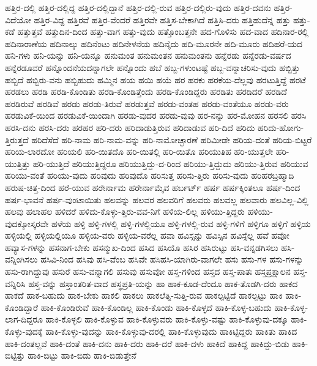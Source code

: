 {ಹತ್ತಿರ-ದಲ್ಲಿ
ಹತ್ತಿರ-ದಲ್ಲಿದ್ದ
ಹತ್ತಿರ-ದಲ್ಲಿದ್ದಾನೆ
ಹತ್ತಿರ-ದಲ್ಲಿ-ರುವ
ಹತ್ತಿರ-ದಲ್ಲಿರು-ವುದು
ಹತ್ತಿರ-ದವನು
ಹತ್ತಿರ-ವಿದೆಯೋ
ಹತ್ತಿರ-ವಿದ್ದ
ಹತ್ತಿರವೆ
ಹತ್ತಿರ-ವೆಂದರೆ
ಹತ್ತಿರವೇ
ಹತ್ತಿಸ-ಬೇಕಾಗಿದೆ
ಹತ್ತಿಸಿ-ದರು
ಹತ್ತಿಹುದೆನ್ನ
ಹತ್ತು
ಹತ್ತು-ಕಡೆ
ಹತ್ತುತ್ತವೆ
ಹತ್ತುದಿನ-ದಿಂದ
ಹತ್ತು-ವಾಗ
ಹತ್ತು-ವುದು
ಹತ್ತೊಂಬತ್ತನೇ
ಹದ-ಗೊಳಿಸು
ಹದ-ವಾದ
ಹದಿನಾರ-ರಲ್ಲಿ
ಹದಿನಾರಾಣೆಯ
ಹದಿನಾಲ್ಕು
ಹದಿನೆಂಟು
ಹದಿನೇಳನೆಯ
ಹದಿನೈದು
ಹದಿ-ಮೂರನೇ
ಹದಿ-ಮೂರು
ಹದಿಹರೆ-ಯದ
ಹನಿ-ಗಳು
ಹನಿ-ಯನ್ನು
ಹನಿ-ಯನ್ನೂ
ಹನುಮಂತ
ಹನುಮಂತನ
ಹನುಮಂತನು
ಹನ್ನೆರಡು
ಹನ್ನೆರಡು-ವರ್ಷದ
ಹನ್ನೆರಡೂವರೆ
ಹನ್ನೊಂದನೆಯದನ್ನಾಗಲೇ
ಹನ್ನೊಂದು
ಹಬೆ
ಹಬ್ಬ-ಗಳುಂಟಷ್ಟೆ
ಹಬ್ಬ-ವನ್ನಾಚರಿಸು-ವುದು
ಹಬ್ಬಿತ್ತು
ಹಬ್ಬಿದೆ
ಹಬ್ಬಿರು-ವನು
ಹಬ್ಬಿಹುದು
ಹಮ್ಮಿನ
ಹಯ
ಹಯಿ
ಹಯೆ
ಹರ
ಹರಕು
ಹರಕೆಯ-ದೆಲ್ಲವು
ಹರಟುತ್ತಿದ್ದೆ
ಹರಟೆ
ಹರಡಲು
ಹರಡಿ
ಹರಡಿ-ಕೊಂಡಿತು
ಹರಡಿ-ಕೊಂಡಿತ್ತೆಂದು
ಹರಡಿ-ಕೊಂಡಿದ್ದರು
ಹರಡಿತು
ಹರಡಿದರೆ
ಹರಡಿದೆ
ಹರಡಿರುವೆ
ಹರಡಿವೆ
ಹರಡು
ಹರಡು-ತಿರುವೆ
ಹರಡುತ್ತವೆ
ಹರಡು-ವಂತಹ
ಹರಡು-ವಂತೆಯೂ
ಹರಡು-ವರು
ಹರಡುವಿಕೆ-ಯಿಂದ
ಹರಡುವಿಕೆ-ಯಿಂದಾಗಿ
ಹರಡು-ವುದರ
ಹರಡು-ವುವು
ಹರ-ನನ್ನು
ಹರ-ಮೋಹನ
ಹರಸಲಿ
ಹರಸಿ
ಹರಸಿ-ದನು
ಹರಸಿ-ದರು
ಹರಹರ
ಹರಿ-ದರು
ಹರಿದಾಡುತ್ತಿರುವ
ಹರಿದಾಡುವ
ಹರಿ-ದಿದೆ
ಹರಿದು
ಹರಿದು-ಹೋಗು-ತ್ತಿರುತ್ತದೆ
ಹರಿದೆಸೆದೆ
ಹರಿ-ನಾಮ
ಹರಿ-ನಾಮ-ವನ್ನು
ಹರಿ-ನಾಮೋಚ್ಛಾರಣೆ
ಹರಿಮೀಡೇ
ಹರಿಯ-ದಂತೆ
ಹರಿಯ-ಬಿಟ್ಟರೆ
ಹರಿಯ-ಲಾರದೋ
ಹರಿಯಲಿ
ಹರಿ-ಯಿತದೊ
ಹರಿ-ಯಿತಲ್ಲಿ
ಹರಿ-ಯಿತೊ
ಹರಿಯುತಿಹ
ಹರಿ-ಯುತ್ತಲೇ
ಹರಿ-ಯುತ್ತಿತ್ತು
ಹರಿ-ಯುತ್ತಿದೆ
ಹರಿಯುತ್ತಿದ್ದರೂ
ಹರಿಯುತ್ತಿದ್ದು-ದ-ರಿಂದ
ಹರಿಯು-ತ್ತಿದ್ದುದು
ಹರಿಯು-ತ್ತಿರುವ
ಹರಿಯುವ
ಹರಿಯು-ವಂತೆ
ಹರಿಯು-ವುದು
ಹರಿವುದು
ಹರಿವುದೊ
ಹರಿಸುತ್ತ
ಹರಿಸು-ತ್ತಿರು
ಹರಿಸು-ವುದು
ಹರಿಹರಬ್ರಹ್ಮಾದಿ
ಹರುಷ-ಚಿತ್ತ-ದಿಂದ
ಹರೆ-ಯುವ
ಹರೇರ್ನಾಮ
ಹರೇರ್ನಾಮೈವ
ಹರ್ಬರ್ಟ್
ಹರ್ಷ
ಹರ್ಷಕ್ಕಿಂತಲೂ
ಹರ್ಷ-ದಿಂದ
ಹರ್ಷ-ಭಾವನೆ
ಹರ್ಷ-ವುಂಟಾಯಿತು
ಹಲವನ್ನು
ಹಲವರ
ಹಲವರಿಗೆ
ಹಲವರು
ಹಲವಲ್ಲ
ಹಲವಾರು
ಹಲವಿಲ್ಲ-ವಿಲ್ಲಿ
ಹಲವು
ಹಲಾಹಲ
ಹಳಿದರೆ
ಹಳಿದು-ಕೊಳ್ಳು-ತ್ತಿರು-ವವ-ನಿಗೆ
ಹಳಿಯ-ಲಿಲ್ಲ
ಹಳಿಯು-ತ್ತಿದ್ದರು
ಹಳಿಯು-ವುದಕ್ಕೋಸ್ಕರವೇ
ಹಳೆಯ
ಹಳ್ಳಿ
ಹಳ್ಳಿ-ಗಳಲ್ಲಿ
ಹಳ್ಳಿ-ಗಳಲ್ಲಿಯೂ
ಹಳ್ಳಿ-ಗಳಲ್ಲಿ-ರುವ
ಹಳ್ಳಿ-ಗಳಿಗೆ
ಹಳ್ಳಿಗೂ
ಹಳ್ಳಿಗೆ
ಹಳ್ಳಿಯ
ಹಳ್ಳಿಯಲ್ಲಿ
ಹಳ್ಳಿಯಲ್ಲಿಯೂ
ಹಳ್ಳಿಯ-ವರು
ಹಳ್ಳಿಯ-ವರೆಲ್ಲ
ಹವಾ
ಹವಿಸ್ಸನ್ನು
ಹವಿಸ್ಸಿನ
ಹವಿಸ್ಸೆಲ್ಲ
ಹವೆ
ಹವೋ
ಹವ್ಯಾಸ-ಗಳನ್ನು
ಹಸನಾಗ-ಬೇಕು
ಹಸನ್ಮುಖ-ದಿಂದ
ಹಸಿದ
ಹಸಿಯೊ
ಹಸಿರ
ಹಸಿರುಟ್ಟು
ಹಸಿ-ವನ್ನಡಗಿಸಲು
ಹಸಿ-ವನ್ನಿಂಗಿಸಲು
ಹಸಿವಿ-ನಿಂದ
ಹಸಿವು
ಹಸಿ-ವೆಂಬ
ಹಸಿವೇ
ಹಸಿಹಸಿ-ಯಾಗಿರು-ವಾಗಲೇ
ಹಸು
ಹಸು-ಗಳ
ಹಸು-ಗಳನ್ನು
ಹಸು-ರಾಗಿದ್ದುವು
ಹಸುರೆ
ಹಸು-ವನ್ನಾಗಲಿ
ಹಸುವು
ಹಸುವೋ
ಹಸ್ತ-ಗಳಿಂದ
ಹಸ್ತದ
ಹಸ್ತ-ಪಾತಃ
ಹಸ್ತಪ್ರಕ್ಷಾಲನ
ಹಸ್ತ-ವನ್ನಿರಿಸಿ
ಹಸ್ತ-ವನ್ನು
ಹಸ್ತಾಂತರಿತ-ವಾದ
ಹಸ್ಥಪ್ರತಿ-ಯನ್ನು
ಹಾ
ಹಾಕ-ಕೂಡ-ದೆಂದೂ
ಹಾಕ-ತೊಡಗಿ-ದರು
ಹಾಕದ
ಹಾಕದೆ
ಹಾಕ-ಬಹುದು
ಹಾಕ-ಬೇಕು
ಹಾಕಲಿ
ಹಾಕಲು
ಹಾಕಲೆತ್ನಿ-ಸುತ್ತಿ-ರುವ
ಹಾಕಲ್ಪಟ್ಟಿದೆ
ಹಾಕಲ್ಪಟ್ಟು
ಹಾಕಿ
ಹಾಕಿ-ಕೊಂಡಿದ್ದಾರೆ
ಹಾಕಿ-ಕೊಂಡಿರುವೆ
ಹಾಕಿ-ಕೊಂಡಿಲ್ಲ
ಹಾಕಿ-ಕೊಂಡು
ಹಾಕಿ-ಕೊಳ್ಳದೆ
ಹಾಕಿ-ಕೊಳ್ಳ-ಬಹುದು
ಹಾಕಿ-ಕೊಳ್ಳ-ಲಾಗ-ದಿದ್ದರೂ
ಹಾಕಿ-ಕೊಳ್ಳಲಿ
ಹಾಕಿ-ಕೊಳ್ಳುವ
ಹಾಕಿ-ಕೊಳ್ಳುವರು
ಹಾಕಿ-ಕೊಳ್ಳು-ವಷ್ಟು
ಹಾಕಿ-ಕೊಳ್ಳುವು-ದಕ್ಕೂ
ಹಾಕಿ-ಕೊಳ್ಳು-ವುದಕ್ಕೆ
ಹಾಕಿ-ಕೊಳ್ಳು-ವುದನ್ನು
ಹಾಕಿ-ಕೊಳ್ಳುವು-ದರಲ್ಲಿ
ಹಾಕಿ-ಕೊಳ್ಳುವುದು
ಹಾಕಿಟ್ಟಿದ್ದರು
ಹಾಕಿತು
ಹಾಕಿದ
ಹಾಕಿ-ದಂತಲ್ಲವೆ
ಹಾಕಿ-ದಂತೆ
ಹಾಕಿ-ದನು
ಹಾಕಿ-ದರು
ಹಾಕಿ-ದರೆ
ಹಾಕಿ-ದಳು
ಹಾಕಿದೆ
ಹಾಕಿದ್ದ
ಹಾಕಿದ್ದು-ಬಿಡು
ಹಾಕಿ-ಬಿಟ್ಟಿತ್ತು
ಹಾಕಿ-ಬಿಟ್ಟು
ಹಾಕಿ-ಬಿಡು
ಹಾಕಿ-ಬಿಡುತ್ತೇನೆ
}
